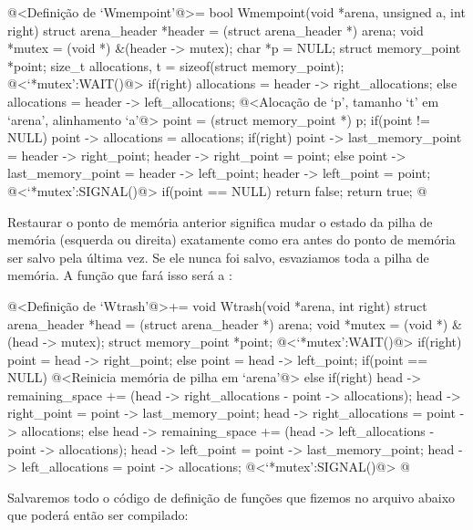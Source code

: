 \iniciocodigo
@<Definição de `Wmempoint'@>=
bool Wmempoint(void *arena, unsigned a, int right){
  struct arena_header *header = (struct arena_header *) arena;
  void *mutex = (void *) &(header -> mutex);
  char *p = NULL;
  struct memory_point *point;
  size_t allocations, t = sizeof(struct memory_point);
  @<`*mutex':WAIT()@>
  if(right)
    allocations = header -> right_allocations;
  else
    allocations = header -> left_allocations;
  @<Alocação de `p', tamanho `t' em `arena', alinhamento `a'@>
  point = (struct memory_point *) p;
  if(point != NULL){
    point -> allocations = allocations;
    if(right){
      point -> last_memory_point = header -> right_point;
      header -> right_point = point;
    }
    else{
      point -> last_memory_point = header -> left_point;
      header -> left_point = point;
    }
  }
  @<`*mutex':SIGNAL()@>
  if(point == NULL)
    return false;
  return true;
}
@
\fimcodigo


Restaurar o ponto de memória anterior significa mudar o estado da
pilha de memória (esquerda ou direita) exatamente como era antes do
ponto de memória ser salvo pela última vez. Se ele nunca foi salvo,
esvaziamos toda a pilha de memória. A função que fará isso será
a :

\iniciocodigo
@<Definição de `Wtrash'@>+=
void Wtrash(void *arena, int right){
  struct arena_header *head = (struct arena_header *) arena;
  void *mutex = (void *) &(head -> mutex);
  struct memory_point *point;
  @<`*mutex':WAIT()@>
  if(right){
    point = head -> right_point;
  }
  else{
    point = head -> left_point;
  }
  if(point == NULL){
    @<Reinicia memória de pilha em `arena'@>
  }
  else{
    if(right){
      head -> remaining_space += (head -> right_allocations -
                                  point -> allocations);
      head -> right_point = point -> last_memory_point;
      head -> right_allocations = point -> allocations;
    }
    else{
      head -> remaining_space += (head -> left_allocations -
                                  point -> allocations);
      head -> left_point = point -> last_memory_point;
      head -> left_allocations = point -> allocations;
    }
  }
  @<`*mutex':SIGNAL()@>
}
@
\fimcodigo



Salvaremos todo o código de definição de funções que fizemos no
arquivo abaixo que poderá então ser compilado:

